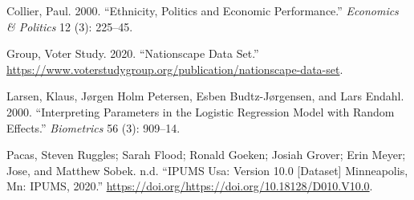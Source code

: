 \documentclass[
  12pt,
]{article}
\begin{document}
\hypertarget{refs}{}
\leavevmode\hypertarget{ref-collier2000}{}%
Collier, Paul. 2000. ``Ethnicity, Politics and Economic Performance.''
\emph{Economics \& Politics} 12 (3): 225--45.

\leavevmode\hypertarget{ref-vsg2020}{}%
Group, Voter Study. 2020. ``Nationscape Data Set.''
\url{https://www.voterstudygroup.org/publication/nationscape-data-set}.

\leavevmode\hypertarget{ref-larsen2000}{}%
Larsen, Klaus, Jørgen Holm Petersen, Esben Budtz-Jørgensen, and Lars
Endahl. 2000. ``Interpreting Parameters in the Logistic Regression Model
with Random Effects.'' \emph{Biometrics} 56 (3): 909--14.

\leavevmode\hypertarget{ref-Steven2020}{}%
Pacas, Steven Ruggles; Sarah Flood; Ronald Goeken; Josiah Grover; Erin
Meyer; Jose, and Matthew Sobek. n.d. ``IPUMS Usa: Version 10.0
{[}Dataset{]} Minneapolis, Mn: IPUMS, 2020.''
\url{https://doi.org/https://doi.org/10.18128/D010.V10.0}.
\end{document}
